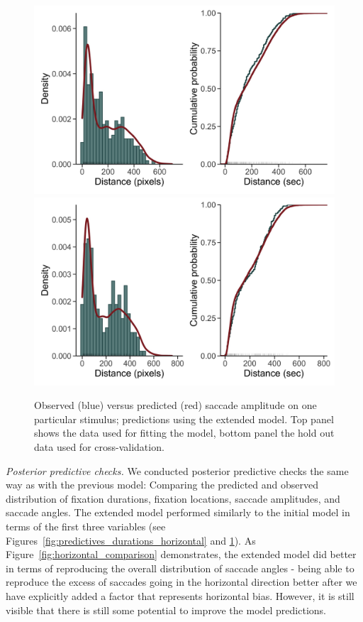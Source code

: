 \documentclass{article}
\begin{document}
\begin{figure}
    \centering
    \includegraphics[width=\textwidth]{figures/fit_model_horizontal/in_sample/amplitude/1251.jpg}
    \includegraphics[width=\textwidth]{figures/fit_model_horizontal/out_sample/amplitude/1251.jpg}
    \caption{Observed (blue) versus predicted (red) saccade amplitude on one particular stimulus; predictions using the extended model. Top panel shows the data used for fitting the model, bottom panel the hold out data used for cross-validation.}
    \label{fig:predictives_amplitude_horizontal}
\end{figure}

\textit{Posterior predictive checks.} We conducted posterior predictive checks the same way as with the previous model: Comparing the predicted and observed distribution of fixation durations, fixation locations, saccade amplitudes, and saccade angles. The extended model performed similarly to the initial model in terms of the first three variables (see Figures~\ref{fig:predictives_durations_horizontal} and \ref{fig:predictives_amplitude_horizontal}). As Figure~\ref{fig:horizontal_comparison} demonstrates, the extended model did better in terms of reproducing the overall distribution of saccade angles - being able to reproduce the excess of saccades going in the horizontal direction better after we have explicitly added a factor that represents horizontal bias. However, it is still visible that there is still some potential to improve the model predictions.
\end{document}
